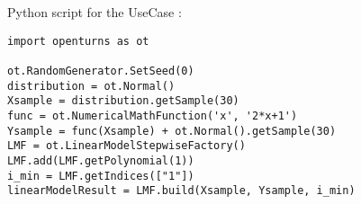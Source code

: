 Python script for the UseCase :

\begin{lstlisting}
import openturns as ot

ot.RandomGenerator.SetSeed(0)
distribution = ot.Normal()
Xsample = distribution.getSample(30)
func = ot.NumericalMathFunction('x', '2*x+1')
Ysample = func(Xsample) + ot.Normal().getSample(30)
LMF = ot.LinearModelStepwiseFactory()
LMF.add(LMF.getPolynomial(1))
i_min = LMF.getIndices(["1"])
linearModelResult = LMF.build(Xsample, Ysample, i_min)

\end{lstlisting}



